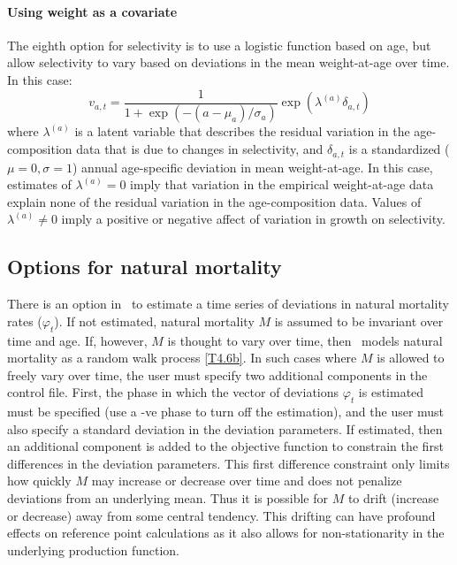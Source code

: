 \paragraph{Using weight as a covariate}
The eighth option for selectivity is to use a logistic function based on age, but allow selectivity to vary based on deviations in the mean weight-at-age over time.  In this case:
\[
v_{a,t} = \frac{1}{1+ \exp{(-(a-\mu_{a})/\sigma_a)}}\exp(\lambda^{(a)} \delta_{a,t})
\]
where $\lambda^{(a)}$ is a latent variable that describes the residual variation in the age-composition data that is due to changes  in selectivity, and $\delta_{a,t}$ is a standardized ($\mu=0, \sigma=1$) annual age-specific deviation in mean weight-at-age.  In this case, estimates of $\lambda^{(a)}=0$ imply that variation in the empirical weight-at-age data explain none of the residual variation in the age-composition data.  Values  of $\lambda^{(a)}\neq0$ imply a positive or negative affect of variation in growth on selectivity.


		\subsection{Options for natural mortality}
		
There is an option in \iscam\ to estimate a time series of deviations in natural mortality rates ($\varphi_t$).  If not estimated, natural mortality $M$ is assumed to be invariant over time and age.  If, however, $M$ is thought to vary over time, then \iscam\ models natural mortality as a random walk process \eqref{T4.6b}.  In such cases where $M$ is allowed to freely vary over time, the user must specify two additional components in the control file. First, the phase in which the vector of deviations $\varphi_t$ is estimated must be specified (use a -ve phase to turn off the estimation), and the user must also specify a standard deviation in the deviation parameters.  If estimated, then an additional component is added to the objective function to constrain the first differences in the deviation parameters.  This first difference constraint only limits how quickly $M$ may increase or decrease over time and does not penalize deviations from an underlying mean.  Thus it is possible for $M$ to drift (increase or decrease) away from some central tendency. This drifting can have profound effects on reference point calculations as it also allows for non-stationarity in the underlying production function.


